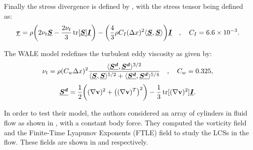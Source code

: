 Finally the stress divergence is defined by , with the stress tensor being defined as:
\begin{equation}
    \underline{\bm{\tau}} = \rho \bigg( 2\nu_t \underline{\bm{S}} - \frac{2 \nu_t}{3}\operatorname{tr}[\underline{\bm{S}}]\underline{\bm{I}} \bigg) - \bigg( \frac{4}{3} \rho C_I (\Delta x)^2 \langle \underline{\bm{S}}, \underline{\bm{S}} \rangle \bigg) \underline{\bm{I}} \quad , \quad C_I = 6.6 \times {10}^{-3}.
    \label{eq:Canelas2016-tau}
\end{equation}

The WALE model redefines the turbulent eddy viscosity as given by:
\begin{equation}
    \nu_t = \rho (C_w \Delta x)^2 \frac{\langle \underline{\bm{S^d}}, \underline{\bm{S^d}} \rangle^{3/2}}{\langle \underline{\bm{S}}, \underline{\bm{S}} \rangle^{5/2} + \langle \underline{\bm{S^d}}, \underline{\bm{S^d}} \rangle^{5/4}} \quad , \quad C_w=0.325,
    \label{eq:Canelas2016-turbulent-eddy-visc}
\end{equation}
\begin{equation}
    \underline{\bm{S^d}} = \frac{1}{2} \bigg( (\nabla \mathbf{v})^2 + \big((\nabla \mathbf{v})^T\big)^2 \bigg) - \frac{1}{3} \operatorname{tr}[(\nabla \mathbf{v})^2] \underline{\bm{I}}.
\end{equation}

In order to test their model, the authors considered an array of cylinders in fluid flow as shown in , with a constant body force. They computed the vorticity field and the Finite-Time Lyapunov Exponents (FTLE) field to study the LCSs in the flow. These fields are shown in  and  respectively.

